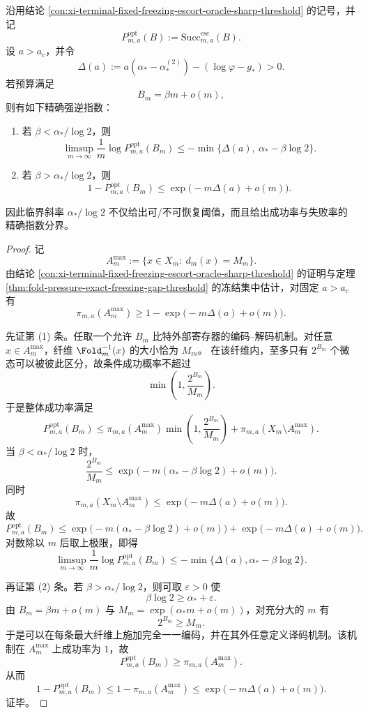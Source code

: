 \begin{theorem}[固定冻结相预言机反演的强逆指数]\label{thm:xi-fixed-freezing-oracle-strong-converse-exponent}
沿用结论 \ref{con:xi-terminal-fixed-freezing-escort-oracle-sharp-threshold} 的记号，并记
\[
P_{m,a}^{\mathrm{opt}}(B):=\mathrm{Succ}^{\mathrm{esc}}_{m,a}(B).
\]
设 \(a>a_{\mathrm c}\)，并令
\[
\Delta(a):=a(\alpha_*-\alpha_*^{(2)})-(\log\varphi-g_*)>0.
\]
若预算满足
\[
B_m=\beta m+o(m),
\]
则有如下精确强逆指数：
\begin{enumerate}
  \item 若 \(\beta<\alpha_*/\log 2\)，则
  \[
  \boxed{\;
  \limsup_{m\to\infty}\frac{1}{m}\log P_{m,a}^{\mathrm{opt}}(B_m)
  \le
  -\min\bigl\{\Delta(a),\ \alpha_*-\beta\log 2\bigr\}.
  \;}
  \]
  \item 若 \(\beta>\alpha_*/\log 2\)，则
  \[
  \boxed{\;
  1-P_{m,a}^{\mathrm{opt}}(B_m)
  \le
  \exp\!\bigl(-m\Delta(a)+o(m)\bigr).
  \;}
  \]
\end{enumerate}
因此临界斜率 \(\alpha_*/\log 2\) 不仅给出可/不可恢复阈值，而且给出成功率与失败率的精确指数分界。
\end{theorem}
\begin{proof}
记
\[
A_m^{\max}:=\{x\in X_m:\ d_m(x)=M_m\}.
\]
由结论 \ref{con:xi-terminal-fixed-freezing-escort-oracle-sharp-threshold} 的证明与定理 \ref{thm:fold-pressure-exact-freezing-gap-threshold} 的冻结集中估计，对固定 \(a>a_{\mathrm c}\) 有
\[
\pi_{m,a}(A_m^{\max})
\ge
1-\exp\!\bigl(-m\Delta(a)+o(m)\bigr).
\]

先证第 (1) 条。任取一个允许 \(B_m\) 比特外部寄存器的编码--解码机制。对任意 \(x\in A_m^{\max}\)，纤维 \(\Fold_m^{-1}(x)\) 的大小恰为 \(M_m\)。
在该纤维内，至多只有 \(2^{B_m}\) 个微态可以被彼此区分，故条件成功概率不超过
\[
\min\!\left(1,\frac{2^{B_m}}{M_m}\right).
\]
于是整体成功率满足
\[
P_{m,a}^{\mathrm{opt}}(B_m)
\le
\pi_{m,a}(A_m^{\max})\min\!\left(1,\frac{2^{B_m}}{M_m}\right)
+\pi_{m,a}(X_m\setminus A_m^{\max}).
\]
当 \(\beta<\alpha_*/\log 2\) 时，
\[
\frac{2^{B_m}}{M_m}
\le
\exp\!\bigl(-m(\alpha_*-\beta\log 2)+o(m)\bigr).
\]
同时
\[
\pi_{m,a}(X_m\setminus A_m^{\max})
\le
\exp\!\bigl(-m\Delta(a)+o(m)\bigr).
\]
故
\[
P_{m,a}^{\mathrm{opt}}(B_m)
\le
\exp\!\bigl(-m(\alpha_*-\beta\log 2)+o(m)\bigr)
+\exp\!\bigl(-m\Delta(a)+o(m)\bigr).
\]
对数除以 \(m\) 后取上极限，即得
\[
\limsup_{m\to\infty}\frac{1}{m}\log P_{m,a}^{\mathrm{opt}}(B_m)
\le
-\min\bigl\{\Delta(a),\alpha_*-\beta\log 2\bigr\}.
\]

再证第 (2) 条。若 \(\beta>\alpha_*/\log 2\)，则可取 \(\varepsilon>0\) 使
\[
\beta\log 2\ge \alpha_*+\varepsilon.
\]
由 \(B_m=\beta m+o(m)\) 与 \(M_m=\exp(\alpha_*m+o(m))\)，对充分大的 \(m\) 有
\[
2^{B_m}\ge M_m.
\]
于是可以在每条最大纤维上施加完全一一编码，并在其外任意定义译码机制。该机制在 \(A_m^{\max}\) 上成功率为 \(1\)，故
\[
P_{m,a}^{\mathrm{opt}}(B_m)\ge \pi_{m,a}(A_m^{\max}).
\]
从而
\[
1-P_{m,a}^{\mathrm{opt}}(B_m)
\le
1-\pi_{m,a}(A_m^{\max})
\le
\exp\!\bigl(-m\Delta(a)+o(m)\bigr).
\]
证毕。
\end{proof}

